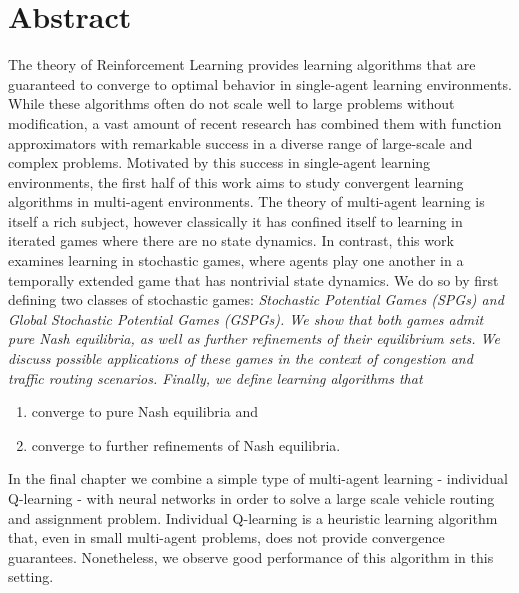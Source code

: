 \section*{Abstract}
\onehalfspacing
The theory of Reinforcement Learning provides learning algorithms that are guaranteed to converge to optimal behavior in single-agent learning environments. While these algorithms often do not scale well to large problems without modification, a vast amount of recent research has combined them with function approximators with remarkable success in a diverse range of large-scale and complex problems. Motivated by this success in single-agent learning environments, the first half of this work aims to study convergent learning algorithms in multi-agent environments. The theory of multi-agent learning is itself a rich subject, however classically it has confined itself to learning in iterated games where there are no state dynamics. In contrast, this work examines learning in stochastic games, where agents play one another in a temporally extended game that has nontrivial state dynamics. We do so by first defining two classes of stochastic games: \em{Stochastic Potential Games (SPGs)} and \em{Global Stochastic Potential Games (GSPGs)}. We show that both games admit pure Nash equilibria, as well as further refinements of their equilibrium sets. We discuss possible applications of these games in the context of congestion and traffic routing scenarios. Finally, we define learning algorithms that

\vspace{.2in}

\begin{enumerate}
    \item converge to pure Nash equilibria and
    \item converge to further refinements of Nash equilibria.
\end{enumerate}

\vspace{.2in}

In the final chapter we combine a simple type of multi-agent learning - individual Q-learning - with neural networks in order to solve a large scale vehicle routing and assignment problem. Individual Q-learning is a heuristic learning algorithm that, even in small multi-agent problems, does not provide convergence guarantees. Nonetheless, we observe good performance of this algorithm in this setting.

\restoregeometry
